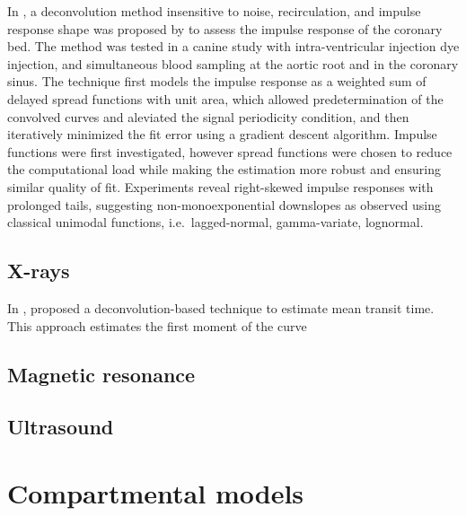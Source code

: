 In \citeyear{Knopp:1976uc}, a deconvolution method insensitive to noise, recirculation, and impulse response shape was proposed by \citet{Knopp:1976uc} to assess the impulse response of the coronary bed.
The method was tested in a canine study with intra-ventricular injection dye injection, and simultaneous blood sampling at the aortic root and in the coronary sinus.
The technique first models the impulse response as a weighted sum of delayed spread functions with unit area, which allowed predetermination of the convolved curves and aleviated the signal periodicity condition, and then iteratively minimized the fit error using a gradient descent algorithm.
Impulse functions were first investigated, however spread functions were chosen to reduce the computational load while making the estimation more robust and ensuring similar quality of fit.
Experiments reveal right-skewed impulse responses with prolonged tails, suggesting non-monoexponential downslopes as observed using classical unimodal functions, i.e.~lagged-normal, gamma-variate, lognormal.






\subsection{X-rays}
In \citeyear{Axel:1982wu}, \citet{Axel:1982wu} proposed a deconvolution-based technique to estimate mean transit time.
This approach estimates the first moment of the curve

\subsection{Magnetic resonance}

\subsection{Ultrasound}


\section{Compartmental models}
\label{sec:CompartmentalModels}



